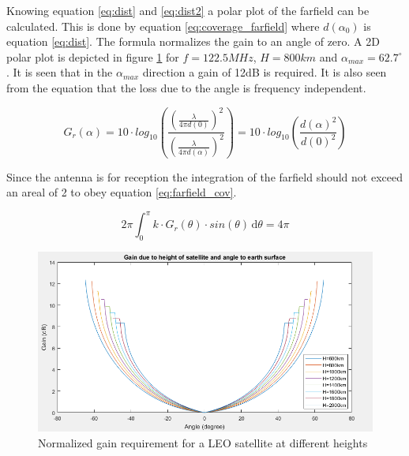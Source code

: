 Knowing equation \ref{eq:dist} and \ref{eq:dist2} a polar plot of the farfield can be calculated. This is done by equation \ref{eq:coverage_farfield} where $d(\alpha_0)$ is equation \ref{eq:dist}. The formula normalizes the gain to an angle of zero. A 2D polar plot 
is depicted in figure \ref{fig:sat_farfield_polar} for $f=122.5MHz$, $H=800km$ and $\alpha_{max} = 62.7^{\circ}$. It is seen that in the $\alpha_{max}$ direction a gain of 12dB is required. It is also seen from the equation that the loss due to the angle is frequency independent.  
  
\begin{equation}
G_r(\alpha) = 10\cdot log_{10}(\frac{(\frac{\lambda}{4 \pi d(0) })^2}{(\frac{\lambda}{4 \pi d(\alpha) })^2}) = 10\cdot log_{10}(\frac{d(\alpha)^2}{d(0)^2})
\end{equation}
\label{eq:coverage_farfield} 

Since the antenna is for reception the integration of the farfield should not exceed an areal of 2 to obey equation \ref{eq:farfield_cov}. 

\begin{equation}
2 \pi \int_0^\pi \! k \cdot G_r(\theta) \cdot sin(\theta) \, \mathrm{d}\theta = 4\pi
\end{equation}
\label{eq:farfield_cov}

\begin{figure}[H]
\centering 
\includegraphics[scale = 0.7]{figures/linkbudget/sat_farfield_matlab.png}
\caption{Normalized gain requirement for a LEO satellite at different heights}
\label{fig:sat_farfield_polar}
\end{figure} 

